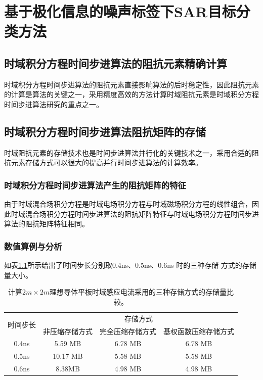 \documentclass[promaster]{thesis-uestc}
\begin{document}
\chapter{基于极化信息的噪声标签下SAR目标分类方法}
\section{时域积分方程时间步进算法的阻抗元素精确计算}
时域积分方程时间步进算法的阻抗元素直接影响算法的后时稳定性，因此阻抗元素的计算是算法的关键之一，采用精度高效的方法计算时域阻抗元素是时域积分方程时间步进算法研究的重点之一。

\section{时域积分方程时间步进算法阻抗矩阵的存储}
时域阻抗元素的存储技术也是时间步进算法并行化的关键技术之一，采用合适的阻抗元素存储方式可以很大的提高并行时间步进算法的计算效率。

\subsection{时域积分方程时间步进算法产生的阻抗矩阵的特征}
由于时域混合场积分方程是时域电场积分方程与时域磁场积分方程的线性组合，因此时域混合场积分方程时间步进算法的阻抗矩阵特征与时域电场积分方程时间步进算法的阻抗矩阵特征相同。

\subsection{数值算例与分析}
如表\ref{tablea}所示给出了时间步长分别取0.4ns、0.5ns、0.6ns 时的三种存储
方式的存储量大小。

\begin{table}[h]
    \caption{计算$2m\times 2m$理想导体平板时域感应电流采用的三种存储方式的存储量比较。}
    \begin{tabular}{cccc}
        \toprule
        \multirow{2}{*}{时间步长} & \multicolumn{3}{c}{存储方式}                         \\
        \cmidrule{2-4}
                              & 非压缩存储方式                  & 完全压缩存储方式 & 基权函数压缩存储方式 \\
        \midrule
        0.4ns                 & 5.59 MB                  & 6.78 MB  & 6.78 MB    \\
        0.5ns                 & 10.17 MB                 & 5.58 MB  & 5.58 MB    \\
        0.6ns                 & 8.38MB                   & 4.98 MB  & 4.98 MB    \\
        \bottomrule
    \end{tabular}
    \label{tablea}
\end{table}
\end{document}
